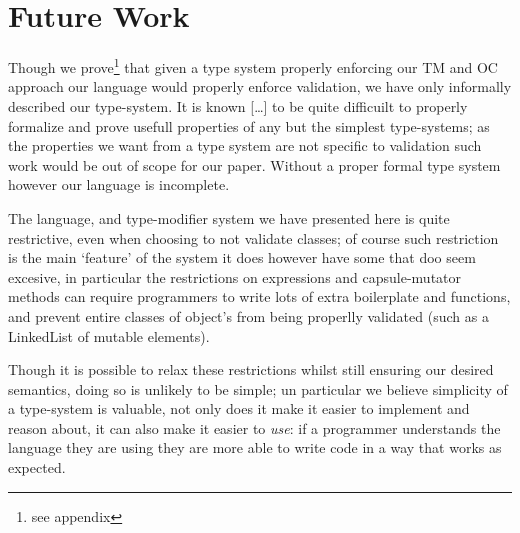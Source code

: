 \section{Future Work}
Though we prove\footnote{see appendix} that given a type system properly enforcing our TM and OC approach our language would properly enforce validation, we have only informally described our type-system. It is known […] to be quite difficuilt to properly formalize and prove usefull properties of any but the simplest type-systems; as the properties we want from a type system are not specific to validation such work would be out of scope for our paper. Without a proper formal type system however our language is incomplete.


The language, and type-modifier system we have presented here is quite restrictive, even when choosing to not validate classes; of course such restriction is the main ‘feature’ of the system it does however have some that doo seem excesive, in particular the restrictions on \@capsule@ expressions and capsule-mutator methods can require programmers to write lots of extra boilerplate and functions, and prevent entire classes of object’s from being properlly validated (such as a LinkedList of mutable elements).


Though it is possible to relax these restrictions whilst still ensuring our desired semantics, doing so is unlikely to be simple; un particular we believe simplicity of a type-system is valuable, not only does it make it easier to implement and reason about, it can also make it easier to \emph{use}: if a programmer understands the language they are using they are more able to write code in a way that works as expected.


